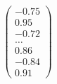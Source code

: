 \documentclass[preview]{standalone}
\begin{document}
\begin{align*}
\begin{pmatrix} -0.75 \\ 0.95 \\ -0.72 \\ \dots \\ 0.86 \\ -0.84 \\ 0.91 \end{pmatrix}
\end{align*}
\end{document}
